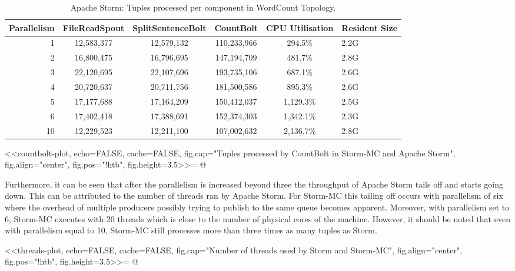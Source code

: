\begin{table}[!htb]
\begin{adjustwidth}{-0.5in}{-0.5in}
\centering
\small
\begin{tabular}{@{}rccccl@{}}
    \textbf{Parallelism} & \textbf{FileReadSpout} & \textbf{SplitSentenceBolt} & \textbf{CountBolt} & \textbf{CPU Utilisation} & \textbf{Resident Size} \\ \toprule
    1 & {12,583,377} & {12,579,132} & {110,233,966} & {294.5\%} & {2.2G} \\
    2 & {16,800,475} & {16,796,695} & {147,194,709} & {481.7\%} & {2.8G} \\
    3 & {22,120,695} & {22,107,696} & {193,735,106} & {687.1\%} & {2.6G} \\
    4 & {20,720,637} & {20,711,756} & {181,500,586} & {895.3\%} & {2.6G} \\
	5 & {17,177,688} & {17,164,209} & {150,412,037} & {1,129.3\%} & {2.5G} \\
	6 & {17,402,418} & {17,388,691} & {152,374,303} & {1,342.1\%} & {2.3G} \\
	10 & {12,229,523} & {12,211,100} & {107,002,632} & {2,136.7\%} & {2.8G} \\
\end{tabular}
\caption{Apache Storm: Tuples processed per component in WordCount Topology.}
\label{table:storm_wordcount}
\end{adjustwidth}
\end{table}

<<countbolt-plot, echo=FALSE, cache=FALSE, fig.cap="Tuples processed by CountBolt in Storm-MC and Apache Storm", fig.align="center", fig.pos="!htb", fig.height=3.5>>=
@

Furthermore, it can be seen that after the parallelism is increased beyond three the throughput of Apache Storm tails off and starts going down. This can be attributed to the number of threads ran by Apache Storm. For Storm-MC this tailing off occurs with parallelism of six where the overhead of multiple producers possibly trying to publish to the same queue becomes apparent. Moreover, with parallelism set to 6, Storm-MC executes with 20 threads which is close to the number of physical cores of the machine. However, it should be noted that even with parallelism equal to 10, Storm-MC still processes more than three times as many tuples as Storm.

<<threads-plot, echo=FALSE, cache=FALSE, fig.cap="Number of threads used by Storm and Storm-MC", fig.align="center", fig.pos="!htb", fig.height=3.5>>=
@

